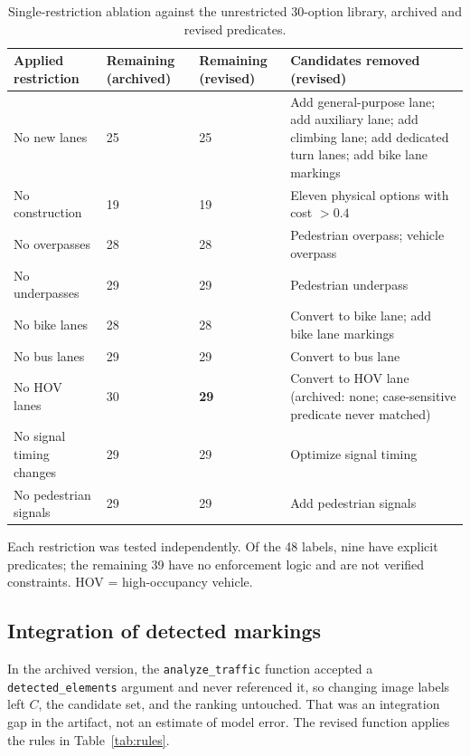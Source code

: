 \documentclass[11pt]{article}
\begin{document}
\begin{table}[htbp]
\centering\small
\caption{Single-restriction ablation against the unrestricted 30-option library, archived and revised predicates.}
\label{tab:restrictions}
\begin{tabularx}{\textwidth}{P{0.20\textwidth} P{0.11\textwidth} P{0.11\textwidth} Y}
\toprule
Applied restriction & Remaining (archived) & Remaining (revised) & Candidates removed (revised) \\
\midrule
No new lanes & 25 & 25 & Add general-purpose lane; add auxiliary lane; add climbing lane; add dedicated turn lanes; add bike lane markings \\
No construction & 19 & 19 & Eleven physical options with cost $>0.4$ \\
No overpasses & 28 & 28 & Pedestrian overpass; vehicle overpass \\
No underpasses & 29 & 29 & Pedestrian underpass \\
No bike lanes & 28 & 28 & Convert to bike lane; add bike lane markings \\
No bus lanes & 29 & 29 & Convert to bus lane \\
No HOV lanes & 30 & \textbf{29} & Convert to HOV lane (archived: none; case-sensitive predicate never matched) \\
No signal timing changes & 29 & 29 & Optimize signal timing \\
No pedestrian signals & 29 & 29 & Add pedestrian signals \\
\bottomrule
\end{tabularx}
\begin{minipage}{0.98\textwidth}\footnotesize Each restriction was tested independently. Of the 48 labels, nine have explicit predicates; the remaining 39 have no enforcement logic and are not verified constraints. HOV = high-occupancy vehicle.\end{minipage}
\end{table}

\subsection{Integration of detected markings}
\label{sec:integration}
In the archived version, the \texttt{analyze\_traffic} function accepted a \texttt{detected\_elements} argument and never referenced it, so changing image labels left $C$, the candidate set, and the ranking untouched. That was an integration gap in the artifact, not an estimate of model error. The revised function applies the rules in Table~\ref{tab:rules}.
\end{document}

